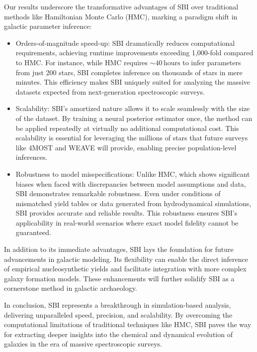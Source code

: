 \documentclass{aa}
\begin{document}
Our results underscore the transformative advantages of SBI over traditional methods like Hamiltonian Monte Carlo (HMC), marking a paradigm shift in galactic parameter inference:
\begin{itemize}
    \item Orders-of-magnitude speed-up: SBI dramatically reduces computational requirements, achieving runtime improvements exceeding 1,000-fold compared to HMC. For instance, while HMC requires $\sim 40\,\mathrm{hours}$ to infer parameters from just 200 stars, SBI completes inference on thousands of stars in mere minutes. This efficiency makes SBI uniquely suited for analyzing the massive datasets expected from next-generation spectroscopic surveys.
    \item Scalability: SBI’s amortized nature allows it to scale seamlessly with the size of the dataset. By training a neural posterior estimator once, the method can be applied repeatedly at virtually no additional computational cost. This scalability is essential for leveraging the millions of stars that future surveys like 4MOST and WEAVE will provide, enabling precise population-level inferences.
    \item Robustness to model misspecifications: Unlike HMC, which shows significant biases when faced with discrepancies between model assumptions and data, SBI demonstrates remarkable robustness. Even under conditions of mismatched yield tables or data generated from hydrodynamical simulations, SBI provides accurate and reliable results. This robustness ensures SBI’s applicability in real-world scenarios where exact model fidelity cannot be guaranteed.
\end{itemize}

In addition to its immediate advantages, SBI lays the foundation for future advancements in galactic modeling. Its flexibility can enable the direct inference of empirical nucleosynthetic yields and facilitate integration with more complex galaxy formation models. These enhancements will further solidify SBI as a cornerstone method in galactic archaeology.

In conclusion, SBI represents a breakthrough in simulation-based analysis, delivering unparalleled speed, precision, and scalability. By overcoming the computational limitations of traditional techniques like HMC, SBI paves the way for extracting deeper insights into the chemical and dynamical evolution of galaxies in the era of massive spectroscopic surveys.
\end{document}
